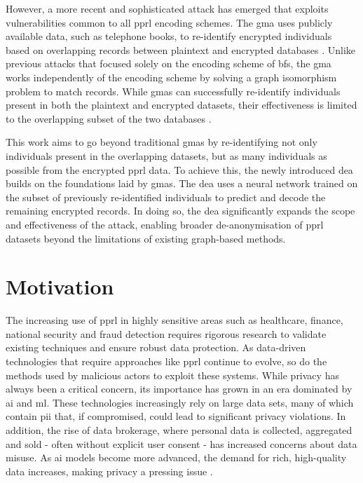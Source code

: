However, a more recent and sophisticated attack has emerged that exploits vulnerabilities common to all \ac{pprl} encoding schemes. 
The \ac{gma} uses publicly available data, such as telephone books, to re-identify encrypted individuals based on overlapping records between plaintext and encrypted databases \cite{vidanage2020graph, schaefer2024}. 
Unlike previous attacks that focused solely on the encoding scheme of \ac{bf}s, the \ac{gma} works independently of the encoding scheme by solving a graph isomorphism problem to match records. 
While \ac{gma}s can successfully re-identify individuals present in both the plaintext and encrypted datasets, their effectiveness is limited to the overlapping subset of the two databases \cite{schaefer2024}.


This work aims to go beyond traditional \ac{gma}s by re-identifying not only individuals present in the overlapping datasets, but as many individuals as possible from the encrypted \ac{pprl} data. 
To achieve this, the newly introduced \ac{dea} builds on the foundations laid by \ac{gma}s. 
The \ac{dea} uses a neural network trained on the subset of previously re-identified individuals to predict and decode the remaining encrypted records. 
In doing so, the \ac{dea} significantly expands the scope and effectiveness of the attack, enabling broader de-anonymisation of \ac{pprl} datasets beyond the limitations of existing graph-based methods.


\section{Motivation}  \label{sec:motivation}
The increasing use of \ac{pprl} in highly sensitive areas such as healthcare, finance, national security and fraud detection requires rigorous research to validate existing techniques and ensure robust data protection. 
As data-driven technologies that require approaches like \ac{pprl} continue to evolve, so do the methods used by malicious actors to exploit these systems.
While privacy has always been a critical concern, its importance has grown in an era dominated by \ac{ai} and \ac{ml}. 
These technologies increasingly rely on large data sets, many of which contain \ac{pii} that, if compromised, could lead to significant privacy violations. 
In addition, the rise of data brokerage, where personal data is collected, aggregated and sold - often without explicit user consent - has increased concerns about data misuse. 
As \ac{ai} models become more advanced, the demand for rich, high-quality data increases, making privacy a pressing issue \cite{ldc2024,cacgroup2024,arxiv2024}.

